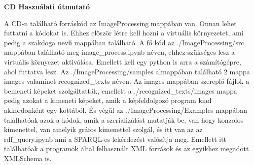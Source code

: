 \pagestyle{empty}

\noindent \textbf{\Large CD Használati útmutató}

\vskip 1cm
A CD-n található forráskód az ImageProcessing mappában van. Onnan lehet futtatni a kódokat is. Ehhez először létre kell hozni a virtuális környezetet, ami pedig a szakdoga nevű mappában található.
A fő kód az ./ImageProcessing/src mappában található meg image\_process.ipynb néven, ehhez szükséges lesz a virtuális környezet aktiválása. Emellett kell egy python is arra a számítógépre, ahol futtatva lesz.
Az ./ImageProcessing/samples almappában található 2 mappa images valaminet recognized\_texts néven. Az images mappában szereplő fájlok a bemeneti képeket szolgáltatták, emellett a ./recognized\_texts/images mappa pedig azokat a kimeneti képeket, amik a képfeldolgozó program kiad akkordonként egy kottából.
És végül az ./ImageProcessing/Examples mappában találhatóak azok a kódok, amik a szerializálást mutatják be, van hogy konzolos kimenettel, van amelyik gráfos kimenettel szolgál, és itt van az az rdf\_query.ipynb ami a SPARQL-es lekérdezést valósítja meg. Emellett itt találhatóak a programok által felhasznált XML források és az egyikhez megadott XMLSchema is.